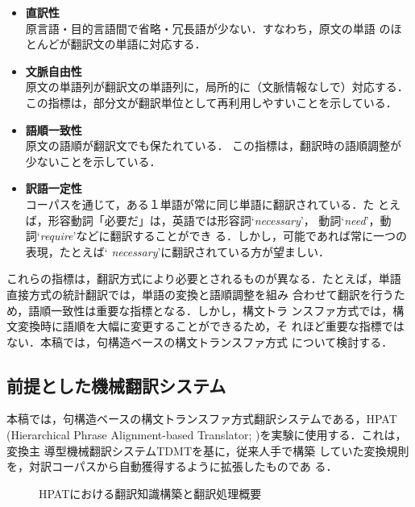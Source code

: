 \begin{itemize}

\item {\bf 直訳性} \\
	原言語・目的言語間で省略・冗長語が少ない．すなわち，原文の単語
	のほとんどが翻訳文の単語に対応する．

\item {\bf 文脈自由性} \\
	原文の単語列が翻訳文の単語列に，局所的に（文脈情報なしで）対応する．
	この指標は，部分文が翻訳単位として再利用しやすいことを示している．

\item {\bf 語順一致性} \\
	原文の語順が翻訳文でも保たれている．
	この指標は，翻訳時の語順調整が少ないことを示している．

\item {\bf 訳語一定性} \\
	コーパスを通じて，ある１単語が常に同じ単語に翻訳されている．た
	とえば，形容動詞「必要だ」は，英語では形容詞`{\it necessary}'，
	動詞`{\it need}'，動詞`{\it require}'などに翻訳することができ
	る．しかし，可能であれば常に一つの表現，たとえば`{\it
	necessary}'に翻訳されている方が望ましい．

\end{itemize}

これらの指標は，翻訳方式により必要とされるものが異なる．たとえば，単語
直接方式の統計翻訳\cite{Brown:SMT1993}では，単語の変換と語順調整を組み
合わせて翻訳を行うため，語順一致性は重要な指標となる．しかし，構文トラ
ンスファ方式では，構文変換時に語順を大幅に変更することができるため，そ
れほど重要な指標ではない．本稿では，句構造ベースの構文トランスファ方式
について検討する．

\subsection{前提とした機械翻訳システム}

本稿では，句構造ベースの構文トランスファ方式翻訳システムである，HPAT
(Hierarchical Phrase Alignment-based Translator;
\cite{Imamura:PatternGeneration2002})を実験に使用する．これは，変換主
導型機械翻訳システムTDMT\cite{Furuse:TDMT1999j}を基に，従来人手で構築
していた変換規則を，対訳コーパスから自動獲得するように拡張したものであ
る．

\begin{figure*}
\begin{center}
\leavevmode\epsfxsize=100mm
\caption{HPATにおける翻訳知識構築と翻訳処理概要}
\label{fig-HPAT-procedure}
\end{center}
\end{figure*}

